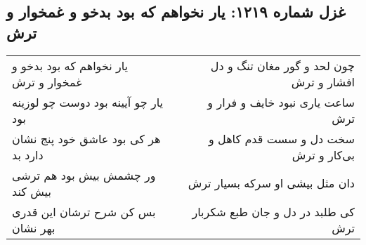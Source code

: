 \begin{center}
\section*{غزل شماره ۱۲۱۹: یار نخواهم که بود بدخو و غمخوار و ترش}
\label{sec:1219}
\begin{longtable}{l p{0.5cm} r}
یار نخواهم که بود بدخو و غمخوار و ترش
&&
چون لحد و گور مغان تنگ و دل افشار و ترش
\\
یار چو آیینه بود دوست چو لوزینه بود
&&
ساعت یاری نبود خایف و فرار و ترش
\\
هر کی بود عاشق خود پنج نشان دارد بد
&&
سخت دل و سست قدم کاهل و بی‌کار و ترش
\\
ور چشمش بیش بود هم ترشی بیش کند
&&
دان مثل بیشی او سرکه بسیار ترش
\\
بس کن شرح ترشان این قدری بهر نشان
&&
کی طلبد در دل و جان طبع شکربار ترش
\\
\end{longtable}
\end{center}
